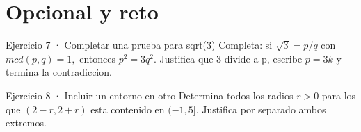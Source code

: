 \documentclass[10pt,a4paper,oneside,openany]{book}
\begin{document}
\section*{Opcional y reto}
\begin{PSevenOptionalFixed}{Ejercicio 7 · Completar una prueba para sqrt(3)}
Completa: si \(\sqrt{3}=p/q\) con \(mcd(p,q)=1,\) entonces \(p^{2}=3q^{2}\). Justifica que \(3\) divide a p, escribe \(p=3k\) y termina la contradiccion.
\end{PSevenOptionalFixed}
\begin{PSevenOptionalFixed}{Ejercicio 8 · Incluir un entorno en otro}
Determina todos los radios \(r>0\) para los que \((2-r,2+r)\) esta contenido en \((-1,5]\). Justifica por separado ambos extremos.
\end{PSevenOptionalFixed}
\end{document}
